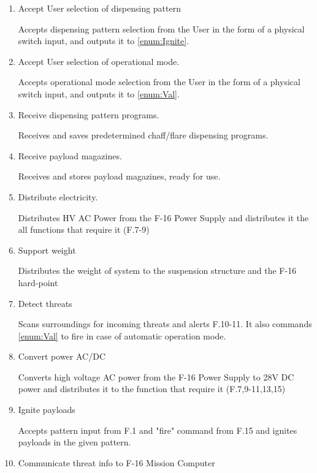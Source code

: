 \documentclass[Main]{subfiles}
\begin{document}
\begin{enumerate}[label=F-\arabic*]
\item Accept User selection of dispensing pattern\label{F-1}

Accepts dispensing pattern selection from the User in the form of a physical switch input, and outputs it to \ref{enum:Ignite}.

\item Accept User selection of operational mode.\label{F-2}

Accepts operational mode selection from the User in the form of a physical switch input, and outputs it to \ref{enum:Val}.

\item Receive dispensing pattern programs.\label{F-3}

Receives and saves predetermined chaff/flare dispensing programs.

\item Receive payload magazines.\label{F-4}

Receives and stores payload magazines, ready for use.

\item Distribute electricity.\label{F-5}

Distributes HV AC Power from the F-16 Power Supply and distributes it the all functions that require it (F.7-9)

\item Support weight\label{F-6}

Distributes the weight of system to the suspension structure and the F-16 hard-point

\item Detect threats\label{F-7}

Scans surroundings for incoming threats and alerts F.10-11. It also commands \ref{enum:Val} to fire in case of automatic operation mode.

\item Convert power AC/DC\label{F-8}

Converts high voltage AC power from the F-16 Power Supply to 28V DC power and distributes it to the function that require it (F.7,9-11,13,15)

\item Ignite payloads\label{enum:Ignite}\label{F-9}

Accepts pattern input from F.1 and "fire" command from F.15 and ignites payloads in the given pattern.

\item Communicate threat info to F-16 Mission Computer\label{F-10}


\end{enumerate}
\end{document}
